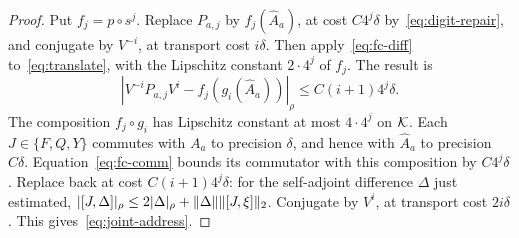 \begin{proof}
Put $f_j=p\circ s^j$. Replace $P_{a,j}$ by $f_j(\widehat A_a)$, at cost $C4^j\delta$ by~\eqref{eq:digit-repair}, and conjugate by $V^{-i}$, at transport cost $i\delta$. Then apply~\eqref{eq:fc-diff} to~\eqref{eq:translate}, with the Lipschitz constant $2\cdot4^j$ of $f_j$. The result is
\[
 |V^{-i}P_{a,j}V^i-f_j(g_i(\widehat A_a))|_\rho
 \le C(i+1)4^j\delta.
\]
The composition $f_j\circ g_i$ has Lipschitz constant at most $4\cdot4^j$ on $\mathcal K$. Each $J\in\{F,Q,Y\}$ commutes with $A_a$ to precision $\delta$, and hence with $\widehat A_a$ to precision $C\delta$. Equation~\eqref{eq:fc-comm} bounds its commutator with this composition by $C4^j\delta$. Replace back at cost $C(i+1)4^j\delta$: for the self-adjoint difference $\Delta$ just estimated, $|[J,\Delta]|_\rho\le2|\Delta|_\rho+\lVert\Delta\rVert\lVert[J,\xi]\rVert_2$. Conjugate by $V^i$, at transport cost $2i\delta$. This gives~\eqref{eq:joint-address}.
\end{proof}

